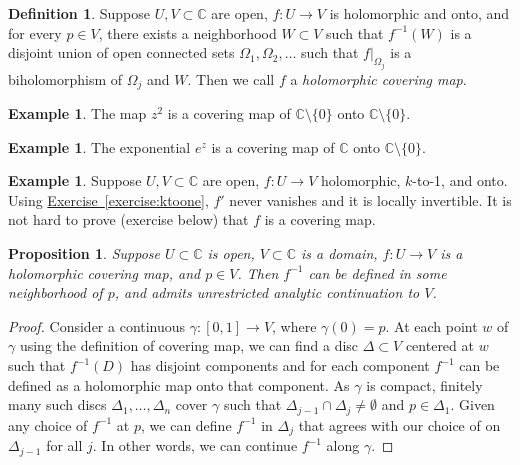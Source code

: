 \documentclass[12pt,openany]{book}
\newcommand{\C}{{\mathbb{C}}}
\newcommand{\myindex}[1]{#1\index{#1}}
\theoremstyle{plain}
\newtheorem{prop}[thm]{Proposition}
\theoremstyle{remark}
\theoremstyle{definition}
\newtheorem{defn}[thm]{Definition}
\theoremstyle{exercise}
\theoremstyle{example}
\newtheorem{example}[thm]{Example}
\newcommand{\exerciseref}[1]{\hyperref[#1]{Exercise~\ref*{#1}}}
\begin{document}
\begin{defn}
Suppose $U,V \subset \C$ are open, $f \colon U \to V$ is holomorphic
and onto, and for every $p \in V$, there exists a neighborhood $W \subset
V$ such that $f^{-1}(W)$ is a disjoint union of open connected sets
$\Omega_1,\Omega_2,\ldots$ such that $f|_{\Omega_j}$ is a biholomorphism of
$\Omega_j$ and $W$.
Then we call $f$ a \emph{\myindex{holomorphic covering map}}.
\end{defn}

\begin{example}
The map $z^2$ is a covering map of $\C \setminus \{ 0 \}$ onto $\C \setminus \{ 0 \}$.
\end{example}

\begin{example}
The exponential $e^z$ is a covering map of $\C$ onto $\C \setminus \{ 0 \}$.
\end{example}

\begin{example}
Suppose $U,V \subset \C$ are open, $f \colon U \to V$ holomorphic, $k$-to-1,
and onto.
Using \exerciseref{exercise:ktoone}, $f'$ never vanishes and
it is locally invertible.  It is not hard to
prove (exercise below) that $f$ is a covering map.
\end{example}

\begin{prop}
Suppose $U \subset \C$ is open, $V \subset \C$ is a domain,
$f \colon U \to V$ is a holomorphic covering map, and $p \in V$.
Then $f^{-1}$ can be defined in some neighborhood
of $p$, and admits unrestricted analytic continuation to $V$.
\end{prop}

\begin{proof}
Consider a continuous $\gamma \colon [0,1] \to V$, where $\gamma(0) = p$.
At each point $w$ of $\gamma$ using the definition of covering map,
we can find a disc $\Delta \subset V$ centered at $w$ such that $f^{-1}(D)$ has 
disjoint components and for each component $f^{-1}$ can be defined as a
holomorphic map onto that component.  As $\gamma$ is compact, finitely many
such discs $\Delta_1,\ldots,\Delta_n$ cover $\gamma$ such that $\Delta_{j-1}
\cap \Delta_j \not= \emptyset$ and $p \in \Delta_1$.  Given any choice
of $f^{-1}$ at $p$, we can define $f^{-1}$ in $\Delta_j$ that agrees with
our choice of on $\Delta_{j-1}$ for all $j$.  In other words, we can continue $f^{-1}$
along $\gamma$.
\end{proof}
\end{document}
